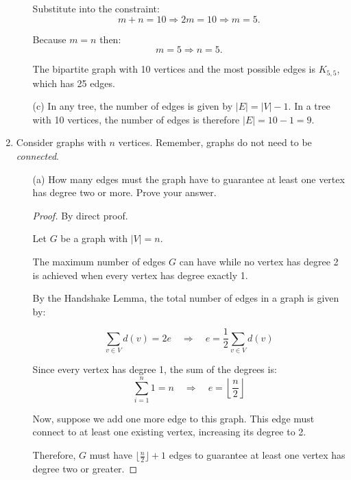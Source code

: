 \documentclass[11pt, letterpaper, includehead]{article}
\theoremstyle{plain}
\theoremstyle{mydefinition}
\theoremstyle{myproperty}
\begin{document}
\begin{enumerate}[label=\textbf{\arabic*}., leftmargin=*]
\begin{enumerate}
        Substitute into the constraint:
        \[
        m + n = 10 \Rightarrow 2m = 10 \Rightarrow m = 5.
        \]

        Because $m = n$ then:
        \[
        m = 5 \Rightarrow n = 5.
        \]

            The bipartite graph with 10 vertices and the most possible edges is $K_{5, 5}$, which has 25 edges.
            \item[(c)] In any tree, the number of edges is given by $|E| = |V|-1$. In a tree with 10 vertices, the number of edges is therefore $|E| = 10-1 = 9$.
          \end{enumerate}
    \item Consider graphs with $n$ vertices. Remember, graphs do not need to be
          \emph{connected}.
          \begin{enumerate}[leftmargin=*]
              \item[(a)] How many edges must the graph have to guarantee at
                  least one vertex
                  has degree two or more. Prove your answer.

                  \begin{proof}

                    By direct proof.

                    Let $G$ be a graph with $|V| = n$. 
                    
                    The maximum number of edges $G$ can have while no vertex has degree 2 is achieved when every vertex has degree exactly 1.

                    By the Handshake Lemma, the total number of edges in a graph is given by:

                    \[
                    \sum_{v \in V} d(v) = 2e \quad \Rightarrow \quad e = \frac{1}{2} \sum_{v \in V} d(v)
                    \]

                    Since every vertex has degree 1, the sum of the degrees is:
                    \[
                    \sum_{i=1}^{n} 1 = n \quad \Rightarrow \quad e = \left\lfloor \frac{n}{2} \right\rfloor
                    \]

                    Now, suppose we add one more edge to this graph. This edge must connect to at least one existing vertex, increasing its degree to 2.
                
                    Therefore, $G$ must have $\lfloor \frac{n}{2} \rfloor + 1$ edges to guarantee at
                    least one vertex has degree two or greater.
                  \end{proof}


\end{enumerate}
\end{enumerate}
\end{document}
